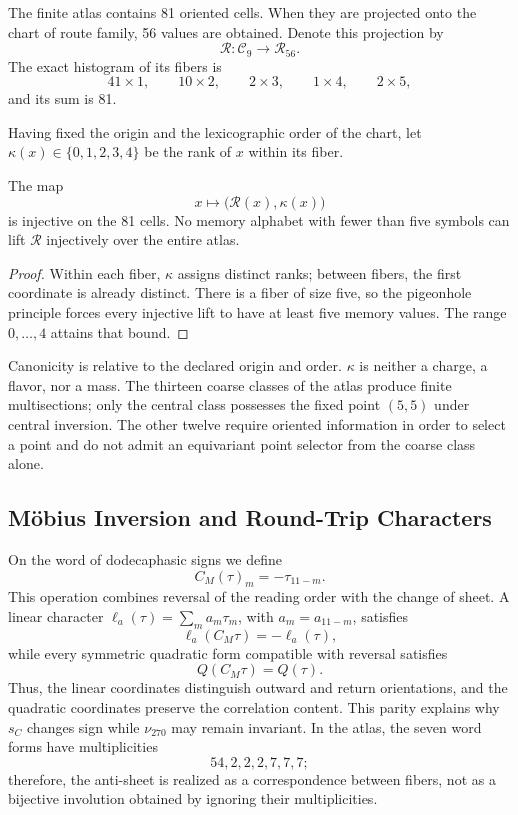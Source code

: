 The finite atlas contains 81 oriented cells. When they are projected onto the chart
of route family, 56 values are obtained. Denote this projection by
\[
 \mathcal R:\mathcal C_9\longrightarrow\mathcal R_{56}.
\]
The exact histogram of its fibers is
\[
 41\times1,
 \qquad10\times2,
 \qquad2\times3,
 \qquad1\times4,
 \qquad2\times5,
\]
and its sum is 81.

Having fixed the origin and the lexicographic order of the chart, let
\(\kappa(x)\in\{0,1,2,3,4\}\) be the rank of \(x\) within its fiber.

\begin{theorem}
\label{thm:selector-interno-minimo}
The map
\[
 x\longmapsto\bigl(\mathcal R(x),\kappa(x)\bigr)
\]
is injective on the 81 cells. No memory alphabet with fewer than
five symbols can lift \(\mathcal R\) injectively over the entire
atlas.
\end{theorem}

\begin{proof}
Within each fiber, \(\kappa\) assigns distinct ranks; between fibers, the
first coordinate is already distinct. There is a fiber of size five, so
the pigeonhole principle forces every injective lift to have at least
five memory values. The range \(0,\ldots,4\) attains that bound.
\end{proof}

Canonicity is relative to the declared origin and order. \(\kappa\) is neither a charge, a flavor, nor a mass. The thirteen coarse classes of the atlas produce finite multisections; only the central class possesses the fixed point \((5,5)\) under central inversion. The other twelve require oriented information in order to select a point and do not admit an equivariant point selector from the coarse class alone.

\subsection{Möbius Inversion and Round-Trip Characters}

On the word of dodecaphasic signs we define
\[
 C_M(\tau)_m=-\tau_{11-m}.
\]
This operation combines reversal of the reading order with the change of
sheet. A linear character
\(\ell_a(\tau)=\sum_ma_m\tau_m\), with
\(a_m=a_{11-m}\), satisfies
\[
 \ell_a(C_M\tau)=-\ell_a(\tau),
\]
while every symmetric quadratic form compatible with reversal
satisfies
\[
 Q(C_M\tau)=Q(\tau).
\]
Thus, the linear coordinates distinguish outward and return orientations, and the
quadratic coordinates preserve the correlation content. This parity explains
why \(s_C\) changes sign while \(\nu_{270}\) may remain
invariant. In the atlas, the seven word forms have multiplicities
\[
 54,2,2,2,7,7,7;
\]
therefore, the anti-sheet is realized as a correspondence between fibers, not as
a bijective involution obtained by ignoring their multiplicities.

